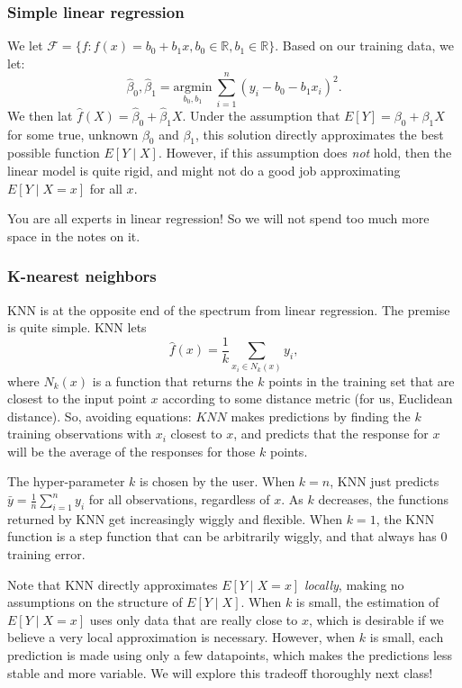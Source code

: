 \documentclass[titlepage,10pt]{scrartcl}
\begin{document}
\subsubsection{Simple linear regression}

We let $\mathcal{F} = \{ f: f(x) = b_0 + b_1 x, b_0 \in \mathbb{R}, b_1 \in \mathbb{R}\}$. Based on our training data, we let: 
\begin{equation}
\label{ls}
\hat{\beta}_0, \hat{\beta}_1 = \underset{b_0, b_1}{\mathrm{argmin}} \ \sum_{i=1}^n (y_i - b_0 - b_1 x_i)^2.	
\end{equation}
We then lat $\hat{f}(X) = \hat{\beta}_0 + \hat{\beta}_1 X$. Under the assumption that $E[Y] = \beta_0 + \beta_1 X$ for some true, unknown $\beta_0$ and $\beta_1$, this solution directly approximates the best possible function $E[Y \mid X]$. However, if this assumption does \emph{not} hold, then the linear model is quite rigid, and might not do a good job approximating $E[Y \mid X=x]$ for all $x$.  

You are all experts in linear regression! So we will not spend too much more space in the notes on it. 

\subsubsection{K-nearest neighbors}

KNN is at the opposite end of the spectrum from linear regression. The premise is quite simple. KNN lets
\begin{equation}
\hat{f}(x) = \frac{1}{k} \sum_{x_i \in N_k(x)} y_i,
\end{equation}
where $N_k(x)$ is a function that returns the $k$ points in the training set that are closest to the input point $x$ according to some distance metric (for us, Euclidean distance). So, avoiding equations: $KNN$ makes predictions by finding the $k$ training observations with $x_i$ closest to $x$, and predicts that the response for $x$ will be the average of the responses for those $k$ points. 

The hyper-parameter $k$ is chosen by the user. When $k=n$, KNN just predicts $\bar{y} = \frac{1}{n} \sum_{i=1}^n y_i$ for all observations, regardless of $x$. As $k$ decreases, the functions returned by KNN get increasingly wiggly and flexible. When $k=1$, the KNN function is a step function that can be arbitrarily wiggly, and that always has $0$ training error. 

Note that KNN directly approximates $E[Y \mid X=x]$ \emph{locally}, making no assumptions on the structure of $E[Y \mid X]$. When $k$ is small, the estimation of $E[Y \mid X=x]$  uses only data that are really close to $x$, which is desirable if we believe a very local approximation is necessary. However, when $k$ is small, each prediction is made using only a few datapoints, which makes the predictions less stable and more variable. We will explore this tradeoff thoroughly next class!
\end{document}
